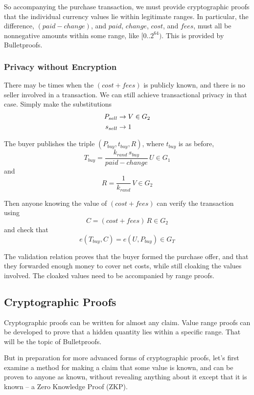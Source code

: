 \documentclass{yellowpaper}
\begin{document}
So accompanying the purchase transaction, we must provide cryptographic proofs that the individual currency values lie within legitimate ranges. In particular, the difference, $(paid - change)$, and $paid$,  $change$, $cost$, and $fees$, must all be nonnegative amounts within some range, like $[0..2^{64})$.   This is provided by Bulletproofs. 

\subsubsection{Privacy without Encryption}
There may be times when the $(cost + fees)$ is publicly known, and there is no seller involved in a transaction. We can still achieve transactional privacy in that case. Simply make the substitutions
\begin{align}
P_{sell} &\to V \in G_2 \notag \\
s_{sell} &\to 1 \notag
\end{align}

The buyer publishes the triple $(P_{buy}, t_{buy}, R)$, where $t_{buy}$ is as before,
$$ T_{buy} = \frac{k_{rand} \, s_{buy}}{paid - change} \, U \in G_1$$
and
$$ R = \frac{1}{k_{rand}}\,V \in G_2$$

Then anyone knowing the value of $(cost + fees)$ can verify the transaction using
$$C = (cost + fees) \, R \in G_2$$
and check that
$$ e(T_{buy},C) = e(U,P_{buy}) \in G_T$$

The validation relation proves that the buyer formed the purchase offer, and that they forwarded enough money to cover net costs, while still cloaking the values involved. The cloaked values need to be accompanied by range proofs.

\subsection{Cryptographic Proofs}
Cryptographic proofs can be written for almost any claim. Value range proofs can be developed to prove that a hidden quantity lies within a specific range. That will be the topic of Bulletproofs. 

But in preparation for more advanced forms of cryptographic proofs, let's first examine a method for making a claim that some value is known, and can be proven to anyone as known, without  revealing anything about it except that it is known -- a Zero Knowledge Proof (ZKP).
\end{document}
